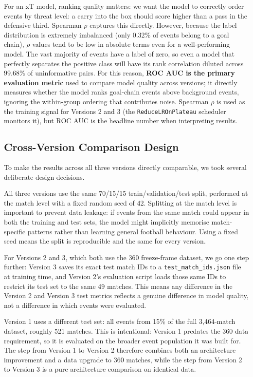 \documentclass{article}
\begin{document}
For an xT model, ranking quality matters: we want the model to correctly order events by threat level: a carry into the box should score higher than a pass in the defensive third. Spearman $\rho$ captures this directly. However, because the label distribution is extremely imbalanced (only 0.32\% of events belong to a goal chain), $\rho$ values tend to be low in absolute terms even for a well-performing model. The vast majority of events have a label of zero, so even a model that perfectly separates the positive class will have its rank correlation diluted across 99.68\% of uninformative pairs. For this reason, \textbf{ROC AUC is the primary evaluation metric} used to compare model quality across versions; it directly measures whether the model ranks goal-chain events above background events, ignoring the within-group ordering that contributes noise. Spearman $\rho$ is used as the training signal for Versions 2 and 3 (the \texttt{ReduceLROnPlateau} scheduler monitors it), but ROC AUC is the headline number when interpreting results.

\subsection{Cross-Version Comparison Design}

To make the results across all three versions directly comparable, we took several deliberate design decisions.

All three versions use the same 70/15/15 train/validation/test split, performed at the match level with a fixed random seed of 42. Splitting at the match level is important to prevent data leakage: if events from the same match could appear in both the training and test sets, the model might implicitly memorise match-specific patterns rather than learning general football behaviour. Using a fixed seed means the split is reproducible and the same for every version.

For Versions 2 and 3, which both use the 360 freeze-frame dataset, we go one step further: Version 3 saves its exact test match IDs to a \texttt{test\_match\_ids.json} file at training time, and Version 2's evaluation script loads those same IDs to restrict its test set to the same 49 matches. This means any difference in the Version 2 and Version 3 test metrics reflects a genuine difference in model quality, not a difference in which events were evaluated.

Version 1 uses a different test set: all events from 15\% of the full 3,464-match dataset, roughly 521 matches. This is intentional: Version 1 predates the 360 data requirement, so it is evaluated on the broader event population it was built for. The step from Version 1 to Version 2 therefore combines both an architecture improvement and a data upgrade to 360 matches, while the step from Version 2 to Version 3 is a pure architecture comparison on identical data.
\end{document}
